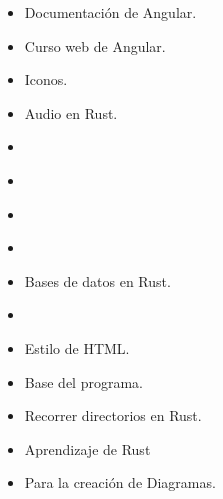 \documentclass[11pt, a4paper]{article}
\begin{document}
          \begin{itemize}
            \item \textcite{angular2025} Documentación de Angular.
            \item \textcite{cursoangular2025} Curso web de Angular.
            \item \textcite{fontawesome} Iconos.
            \item \textcite{lofty} Audio en Rust.
            \item \textcite{mdnarraybuffer}
            \item \textcite{mdnblob}
            \item \textcite{mdncanvas}
            \item \textcite{mdnpadStart}
            \item \textcite{rusqlite} Bases de datos en Rust.
            \item \textcite{stackoverflowshuffle}
            \item \textcite{tailwind2025} Estilo de HTML.
            \item \textcite{tauri2024} Base del programa.
            \item \textcite{walkdir} Recorrer directorios en Rust.
            \item \textcite{youtuberust2024} Aprendizaje de Rust
            \item \textcite{mermaid} Para la creación de Diagramas.
          \end{itemize}
\printbibliography
\end{document}
